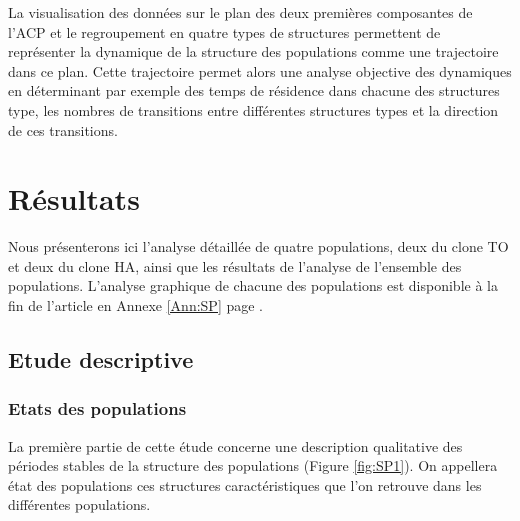 La visualisation des données sur le plan des deux premières composantes de l'ACP
et le regroupement en quatre types de structures permettent de représenter la
dynamique de la structure des populations comme une trajectoire dans ce plan.
Cette trajectoire permet alors une analyse objective des dynamiques en
déterminant par exemple des temps de résidence dans chacune des structures type,
les nombres de transitions entre différentes structures types et la direction de
ces transitions. 

\section{Résultats}

Nous présenterons ici l'analyse détaillée de quatre populations, deux du clone
TO et deux du clone HA, ainsi que les résultats de l'analyse de l'ensemble des
populations. L'analyse graphique de chacune des populations est disponible à la
fin de l'article en Annexe \ref{Ann:SP} page \pageref{Ann:SP}. 

\subsection{Etude descriptive}

\subsubsection{Etats des populations}

La première partie de cette étude concerne une description qualitative des
périodes stables de la structure des populations (Figure \ref{fig:SP1}). On
appellera état des populations ces structures caractéristiques que l'on retrouve dans les
différentes populations. 

